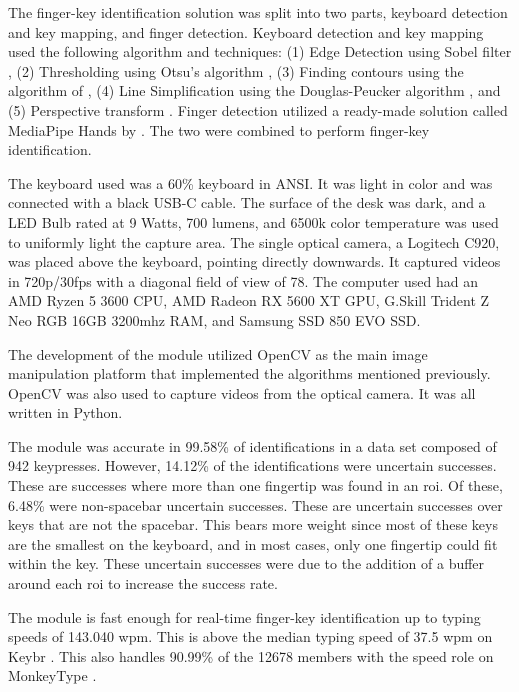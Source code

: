 \documentclass{report}
\begin{document}
The finger-key identification solution was split into two parts, keyboard
detection and key mapping, and finger detection. Keyboard detection and key
mapping used the following algorithm and techniques: (1) Edge Detection using
Sobel filter \parencite{sobel2014}, (2) Thresholding using Otsu's algorithm
\parencite{otsu}, (3) Finding contours using the algorithm of
\textcite{contours}, (4) Line Simplification using the Douglas-Peucker algorithm
\parencite{douglas-peucker}, and (5) Perspective transform
\parencite{opencv-image-transform}. Finger detection utilized a ready-made
solution called MediaPipe Hands by \textcite{mediapipe}. The two were combined
to perform finger-key identification.

The keyboard used was a 60\% keyboard in ANSI. It was light in color and was
connected with a black USB-C cable. The surface of the desk was dark, and a LED
Bulb rated at 9 Watts, 700 lumens, and 6500k color temperature was used to
uniformly light the capture area. The single optical camera, a Logitech C920,
was placed above the keyboard, pointing directly downwards. It captured videos
in 720p/30fps with a diagonal field of view of 78\degree \parencite{logitech}.
The computer used had an AMD Ryzen 5 3600 CPU, AMD Radeon RX 5600 XT GPU,
G.Skill Trident Z Neo RGB 16GB 3200mhz RAM, and Samsung SSD 850 EVO SSD.

The development of the module utilized OpenCV as the main image manipulation
platform that implemented the algorithms mentioned previously. OpenCV was also
used to capture videos from the optical camera. It was all written in Python.

The module was accurate in 99.58\% of identifications in a data set composed of
942 keypresses. However, 14.12\% of the identifications were uncertain
successes. These are successes where more than one fingertip was found in an
\ac{roi}. Of these, 6.48\% were non-spacebar uncertain successes. These are
uncertain successes over keys that are not the spacebar. This bears more weight
since most of these keys are the smallest on the keyboard, and in most cases,
only one fingertip could fit within the key. These uncertain successes were due
to the addition of a buffer around each \ac{roi} to increase the success rate.

The module is fast enough for real-time finger-key identification up to typing
speeds of 143.040 \ac{wpm}. This is above the median typing speed of 37.5
\ac{wpm} on Keybr \parencite{keybr}. This also handles 90.99\% of the 12678
members with the speed role on MonkeyType \parencite{monkey-stats}.
\end{document}
